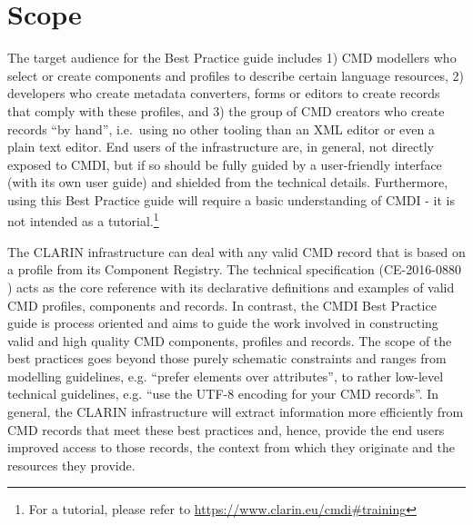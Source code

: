 \section{Scope}\label{scope}

The target audience for the Best Practice guide includes 1) CMD
modellers who select or create components and profiles to describe certain language resources, 2) developers who create metadata converters, forms or editors to create records that comply with these profiles, and 3) the group of CMD creators who create records ``by hand'', i.e.~using no other tooling than an XML editor or even a plain text editor. End users of the infrastructure are, in general, not directly exposed to CMDI, but if so should be fully guided by a user-friendly interface (with its own user guide) and shielded from the
technical details. Furthermore, using this Best Practice guide will require a basic understanding of CMDI - it is not intended as a tutorial.\footnote{For a tutorial, please refer to
  \url{https://www.clarin.eu/cmdi\#training}}

The CLARIN infrastructure can deal with any valid CMD record that is based on a profile from its Component Registry. The technical specification (CE-2016-0880 \cite{ce20160880}) acts as the core reference with its declarative definitions and examples of valid CMD profiles, components and records. In contrast, the CMDI Best Practice guide is process oriented and aims to guide the work involved in constructing valid and high quality CMD components, profiles and records. The scope of the best practices goes beyond those purely schematic constraints and ranges from modelling guidelines, e.g. ``prefer elements over attributes'', to rather low-level technical guidelines, e.g. ``use the UTF-8 encoding for your CMD records''. In general, the CLARIN infrastructure will extract information more efficiently from CMD records that meet these best practices and, hence, provide the end users improved access to those
records, the context from which they originate and the resources they provide.
